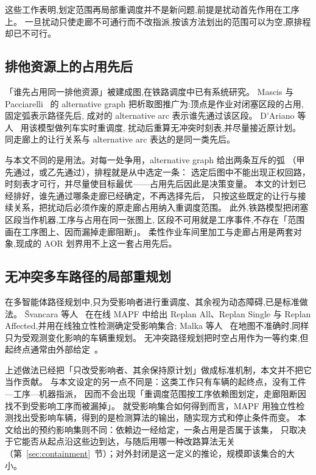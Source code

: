 \documentclass[manuscript,screen,review]{acmart}
\begin{document}
这些工作表明,划定范围再局部重调度并不是新问题,前提是扰动首先作用在工序上。
一旦扰动只使走廊不可通行而不改指派,按该方法划出的范围可以为空,原排程却已不可行。

\subsection{排他资源上的占用先后}
\label{sec:rw_ag}

「谁先占用同一排他资源」被建成图,在铁路调度中已有系统研究。
Mascis 与 Pacciarelli~\cite{mascis2002alternative} 的 alternative graph
把析取图推广为:顶点是作业对闭塞区段的占用,固定弧表示路径先后,
成对的 alternative arc 表示谁先通过该区段。
D'Ariano 等人~\cite{dariano2007branch} 用该模型做列车实时重调度,
扰动后重算无冲突时刻表,并尽量接近原计划。
同走廊上的让行关系与 alternative arc 表达的是同一类先后。

与本文不同的是用法。对每一处争用，alternative graph 给出两条互斥的弧
（甲先通过，或乙先通过），排程就是从中选定一条：
选定后图中不能出现正权回路，时刻表才可行，并尽量使目标最优——占用先后因此是决策变量。
本文的计划已经排好，谁先通过哪条走廊已经确定，不再选择先后，
只按这些既定的让行与接续关系，把扰动后必须作废的原走廊占用纳入重调度范围。
此外,铁路模型把闭塞区段当作机器,工序与占用在同一张图上,
区段不可用就是工序事件,不存在「范围画在工序图上、因而漏掉走廊阻断」。
柔性作业车间里加工与走廊占用是两套对象,现成的 AOR 划界用不上这一套占用先后。

\subsection{无冲突多车路径的局部重规划}
\label{sec:rw_mapf}

在多智能体路径规划中,只为受影响者进行重调度、其余视为动态障碍,已是标准做法。
Švancara 等人~\cite{svancara2019online} 在在线 MAPF 中给出
Replan All、Replan Single 与 Replan Affected,并用在线独立性检测确定受影响集合;
Malka 等人~\cite{malka2024online} 在地图不准确时,同样只为受观测变化影响的车辆重规划。
无冲突路径规划把时空占用作为一等约束,但起终点通常由外部给定~\cite{zhang2024guidance}。

上述做法已经把「只改受影响者、其余保持原计划」做成标准机制，本文并不把它当作贡献。
与本文设定的另一点不同是：这类工作只有车辆的起终点，没有工件—工序—机器指派，
因而不会出现「重调度范围按工序依赖图划定，走廊阻断因找不到受影响工序而被漏掉」。
就受影响集合如何得到而言，MAPF 用独立性检测找出受影响车辆，得到的是检测算法的输出，随实现方式和停止条件而变。
本文给出的预约影响集则不同：依赖边一经给定，一条占用是否属于该集，
只取决于它能否从起点沿这些边到达，与随后用哪一种改路算法无关
（第~\ref{sec:containment}~节）；对外封闭是这一定义的推论，规模即该集合的大小。
\end{document}
